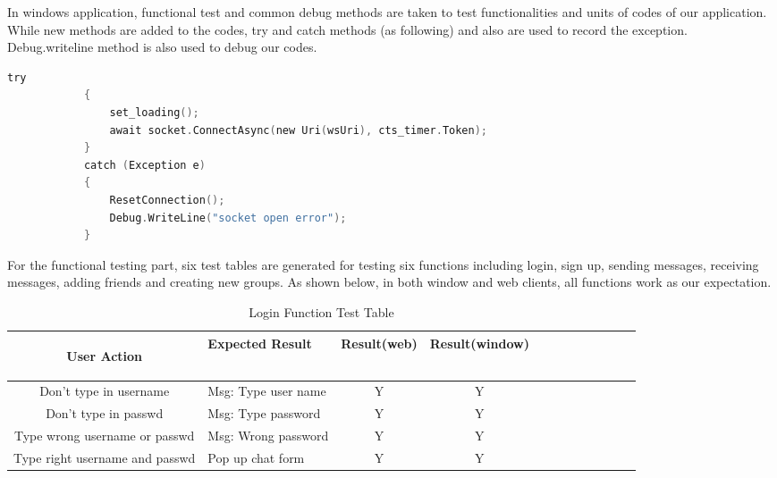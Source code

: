 \documentclass[a4paper,11pt]{article}
\begin{document}
In windows application, functional test and common debug methods are taken to test functionalities and units of codes of our application. While new methods are added to the codes, try and catch methods (as following) and also are used to record the exception. Debug.writeline method is also used to debug our codes.
\begin{lstlisting}[language=C]
 try
            {
                set_loading();
                await socket.ConnectAsync(new Uri(wsUri), cts_timer.Token);
            }
            catch (Exception e)
            {
                ResetConnection();
                Debug.WriteLine("socket open error");
            }
\end{lstlisting}


For the functional testing part, six test tables are generated for testing six functions including login, sign up, sending messages, receiving messages, adding friends and creating new groups. As shown below, in both window and web clients, all functions work as our expectation.  

\begin{table}[h!]

\small
  \caption{Login Function Test Table}
\begin{tabular}{|c|l|c|c|c|c|c|c|c|c|c|c|}
 \hline

  \label{tab:table1}

   User Action & Expected Result & Result(web) & Result(window)\\ 
    \hline
       

    Don't type in username  & Msg: Type user name & Y & Y\\ \hline
 
      Don't type in passwd  & Msg: Type password & Y & Y\\ \hline
   
        Type wrong username or passwd & Msg: Wrong password & Y & Y\\ \hline
        Type right username and passwd & Pop up chat form & Y & Y \\ \hline
  \end{tabular}
\end{table}
\end{document}

